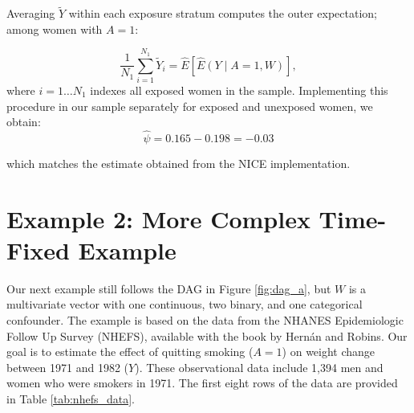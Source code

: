 \documentclass[12pt]{article}
\numberwithin{equation}{section}
\begin{document}
\newpage


Averaging $\widetilde{Y}$ within each exposure stratum computes the outer expectation; among women with $A=1$:

\begin{equation}
\frac{1}{N_1}\sum_{i = 1}^{N_1} \widetilde{Y}_i = \hat{E}[\hat{E}(Y \mid A = 1, W)],
\end{equation}
\noindent where $i = 1 \ldots N_1$ indexes all exposed women in the sample. 
Implementing this procedure in our sample separately for exposed and unexposed women, we obtain:
\begin{equation}
\hat{\psi} = 0.165 - 0.198 = -0.03
\end{equation} 

\noindent which matches the estimate obtained from the NICE implementation.

\section{Example 2: More Complex Time-Fixed Example}

Our next example still follows the DAG in Figure \ref{fig:dag_a}, but $W$ is a  multivariate vector with one continuous, two binary, and one categorical confounder. The example is based on the data from the NHANES Epidemiologic Follow Up Survey (NHEFS), available with the book by Hern\'{a}n and Robins.\cite{Hernan2025} Our goal is to estimate the effect of quitting smoking ($A = 1$) on weight change between 1971 and 1982 ($Y$). These observational data include 1,394 men and women who were smokers in 1971. The first eight rows of the data are provided in Table \ref{tab:nhefs_data}. %
\end{document}
